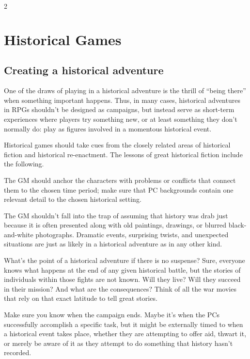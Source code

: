 \begin{multicols}{2}

\chapter{Historical Games}

\section{Creating a historical adventure}

One of the draws of playing in a historical adventure is the thrill of “being there” when something important happens. Thus, in many cases, historical adventures in RPGs shouldn’t be designed as campaigns, but instead serve as short-term experiences where players try something new, or at least something they don’t normally do: play as figures involved in a momentous historical event.

Historical games should take cues from the closely related areas of historical fiction and historical re-enactment. The lessons of great historical fiction include the following.

The GM should anchor the characters with problems or conflicts that connect them to the chosen time period; make sure that PC backgrounds contain one relevant detail to the chosen historical setting.

The GM shouldn’t fall into the trap of assuming that history was drab just because it is often presented along with old paintings, drawings, or blurred black-and-white photographs. Dramatic events, surprising twists, and unexpected situations are just as likely in a historical adventure as in any other kind.

What’s the point of a historical adventure if there is no suspense? Sure, everyone knows what happens at the end of any given historical battle, but the stories of individuals within those fights are not known. Will they live? Will they succeed in their mission? And what are the consequences? Think of all the war movies that rely on that exact latitude to tell great stories.

Make sure you know when the campaign ends. Maybe it’s when the PCs successfully accomplish a specific task, but it might be externally timed to when a historical event takes place, whether they are attempting to offer aid, thwart it, or merely be aware of it as they attempt to do something that history hasn’t recorded.


\end{multicols}
